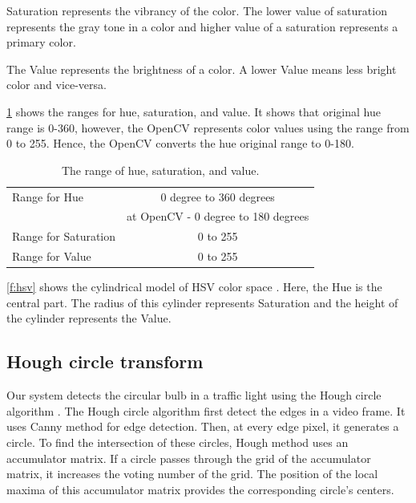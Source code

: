 Saturation represents the vibrancy of the color.
The lower value of saturation represents the gray tone in a color and higher value of a saturation represents a primary color.

The Value represents the brightness of a color.
A lower Value means less bright color and vice-versa.

\ref{t:hsv} shows the ranges for hue, saturation, and value.
It shows that original hue range is 0-360, however, the OpenCV \cite{opencv} represents color values using the range from 0 to 255. 
Hence, the OpenCV converts the hue original range to 0-180.

\begin{table}[h!]
  \centering
  
  \begin{tabular}{  l  c  }
    \rowcolor{gray!50}
    \hline
    Range for Hue & 0 degree to 360 degrees \\
    \rowcolor{gray!50}    
    & at OpenCV - 0 degree to 180 degrees\\  
    Range for Saturation & 0 to 255 \\
    Range for Value & 0 to 255 \\
    \hline 
    
  \end{tabular}
  \caption{The range of hue, saturation, and value.}
  \label{t:hsv}
\end{table}


\ref{f:hsv} shows the cylindrical model of HSV color space \cite{hsv}.
Here, the Hue is the central part.
The radius of this cylinder represents Saturation and the height of the cylinder represents the Value.

\subsection{Hough circle transform}
Our system detects the circular bulb in a traffic light using the Hough circle algorithm \cite{houghcir_alg}.
The Hough circle algorithm first detect the edges in a video frame.
It uses Canny method \cite{canny} for edge detection.
Then, at every edge pixel, it generates a circle.
To find the intersection of these circles, Hough method uses an accumulator matrix.
If a circle passes through the grid of the accumulator matrix, it increases the voting number of the grid.
The position of the local maxima of this accumulator matrix provides the corresponding circle's centers.

